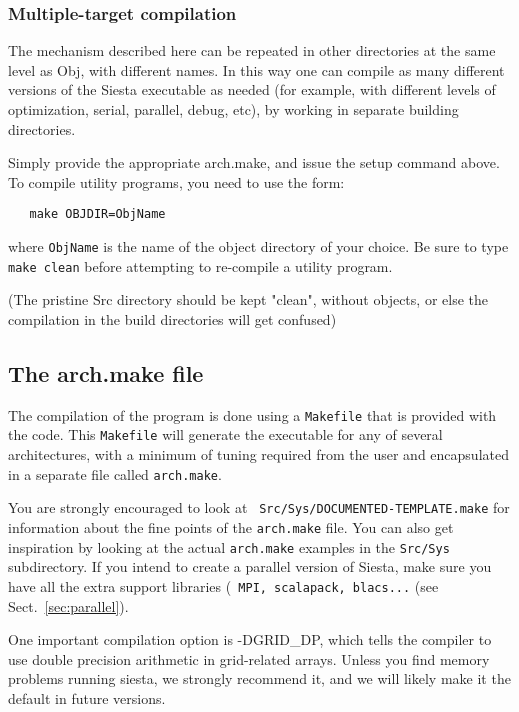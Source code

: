 \documentclass[11pt]{article}
\begin{document}
\subsubsection{Multiple-target compilation}

The mechanism described here can be repeated in other directories at
the same level as Obj, with different names. In this way one can
compile as many different versions of the {\sc Siesta} executable as
needed (for example, with different levels of optimization, serial,
parallel, debug, etc), by working in separate building directories.

Simply provide the appropriate arch.make, and issue the setup command
above. To compile utility programs, you need to use the form:

\begin{verbatim}
   make OBJDIR=ObjName
\end{verbatim}

where {\tt ObjName} is the name of the object directory of your
choice. Be sure to type {\tt make clean} before attempting to
re-compile a utility program.

(The pristine Src directory should be kept "clean", without objects, or else
the compilation in the build directories will get confused)


\subsection{The arch.make file}
\label{sec:arch-make}

The compilation of the program is done using a {\tt Makefile} that is
provided with the code. This {\tt Makefile} will
generate the executable for any of several architectures, with a
minimum of tuning required from the user and encapsulated in a
separate file called {\tt arch.make}.

You are strongly encouraged to look at {\tt
  Src/Sys/DOCUMENTED-TEMPLATE.make} for information about the fine
points of the {\tt arch.make} file. You can also get inspiration by
looking at the actual {\tt arch.make} examples in the {\tt Src/Sys}
subdirectory. If you intend to create a parallel version of {\sc
  Siesta}, make sure you have all the extra support libraries ({\tt
  MPI, scalapack, blacs...} (see Sect.~\ref{sec:parallel}).
  
One important compilation option is -DGRID\_DP, which tells the
compiler to use double precision arithmetic in grid-related arrays.
Unless you find memory problems running siesta, we strongly 
recommend it, and we will likely make it the default in future versions.
\end{document}
